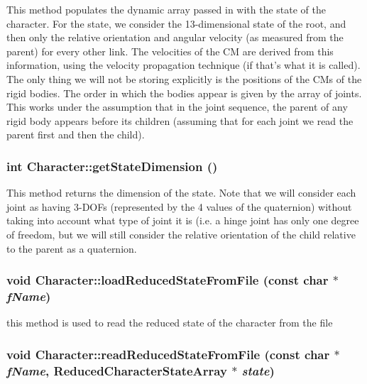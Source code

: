 This method populates the dynamic array passed in with the state of the character. For the state, we consider the 13-\/dimensional state of the root, and then only the relative orientation and angular velocity (as measured from the parent) for every other link. The velocities of the CM are derived from this information, using the velocity propagation technique (if that's what it is called). The only thing we will not be storing explicitly is the positions of the CMs of the rigid bodies. The order in which the bodies appear is given by the array of joints. This works under the assumption that in the joint sequence, the parent of any rigid body appears before its children (assuming that for each joint we read the parent first and then the child). \hypertarget{classCartWheel_1_1Core_1_1Character_a5143906f573098dcdb77419ca5deb643}{
\subsubsection[{getStateDimension}]{\setlength{\rightskip}{0pt plus 5cm}int Character::getStateDimension ()}}
\label{classCartWheel_1_1Core_1_1Character_a5143906f573098dcdb77419ca5deb643}
This method returns the dimension of the state. Note that we will consider each joint as having 3-\/DOFs (represented by the 4 values of the quaternion) without taking into account what type of joint it is (i.e. a hinge joint has only one degree of freedom, but we will still consider the relative orientation of the child relative to the parent as a quaternion. \hypertarget{classCartWheel_1_1Core_1_1Character_a1efceb80f22e15bfee75f80852156fed}{
\subsubsection[{loadReducedStateFromFile}]{\setlength{\rightskip}{0pt plus 5cm}void Character::loadReducedStateFromFile (const char $\ast$ {\em fName})}}
\label{classCartWheel_1_1Core_1_1Character_a1efceb80f22e15bfee75f80852156fed}
this method is used to read the reduced state of the character from the file \hypertarget{classCartWheel_1_1Core_1_1Character_a888c025d010c24ad3ca3aa19fad65e11}{
\subsubsection[{readReducedStateFromFile}]{\setlength{\rightskip}{0pt plus 5cm}void Character::readReducedStateFromFile (const char $\ast$ {\em fName}, \/  {\bf ReducedCharacterStateArray} $\ast$ {\em state})}}
